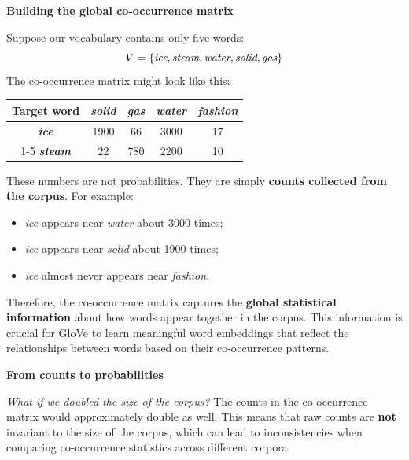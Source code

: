 \highspace
\begin{flushleft}
    \textcolor{Green3}{ \textbf{Building the global co-occurrence matrix}}
\end{flushleft}
Suppose our vocabulary contains only five words:
\begin{equation*}
    V = \left\{\emph{ice}, \emph{steam}, \emph{water}, \emph{solid}, \emph{gas}\right\}
\end{equation*}
The co-occurrence matrix might look like this:
\begin{center}
    \begin{tabular}{@{} c | c | c | c | c @{}}
        \toprule
        \textbf{Target word} & \textbf{\emph{solid}} & \textbf{\emph{gas}} & \textbf{\emph{water}} & \textbf{\emph{fashion}} \\
        \midrule
        \textbf{\emph{ice}}   &  1900 &  66 &  3000 &      17 \\
        \cmidrule{1-5}
        \textbf{\emph{steam}} &    22 & 780 &  2200 &      10 \\
        \bottomrule
    \end{tabular}
\end{center}
\noindent
These numbers are not probabilities. They are simply \textbf{counts collected from the corpus}. For example:
\begin{itemize}
    \item \emph{ice} appears near \emph{water} about 3000 times;
    \item \emph{ice} appears near \emph{solid} about 1900 times;
    \item \emph{ice} almost never appears near \emph{fashion}.
\end{itemize}
Therefore, the co-occurrence matrix captures the \textbf{global statistical information} about how words appear together in the corpus. This information is crucial for GloVe to learn meaningful word embeddings that reflect the relationships between words based on their co-occurrence patterns.

\highspace
\begin{flushleft}
    \textcolor{Green3}{ \textbf{From counts to probabilities}}
\end{flushleft}
\textcolor{Red2}{} \emph{What if we doubled the size of the corpus?} The counts in the co-occurrence matrix would approximately double as well. This means that raw counts are \textbf{not} invariant to the size of the corpus, which can lead to inconsistencies when comparing co-occurrence statistics across different corpora.

